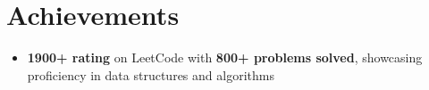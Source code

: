 \documentclass[letterpaper,11pt]{article}
\newcommand{\resumeItem}[1]{
  \item\small{
    {#1 \vspace{-2pt}}
  }
}
\newcommand{\resumeItemListStart}{\begin{itemize}}
\newcommand{\resumeItemListEnd}{\end{itemize}\vspace{-5pt}}
\begin{document}


\section{Achievements}
  \vspace{3pt}
  \resumeItemListStart
    \resumeItem{
      \textbf{1900+ rating} on LeetCode with \textbf{800+ problems solved}, showcasing proficiency in data structures and algorithms
      \href{https://leetcode.com/srinjoy003/}{\faExternalLink}
    }
  \resumeItemListEnd




\end{document}
